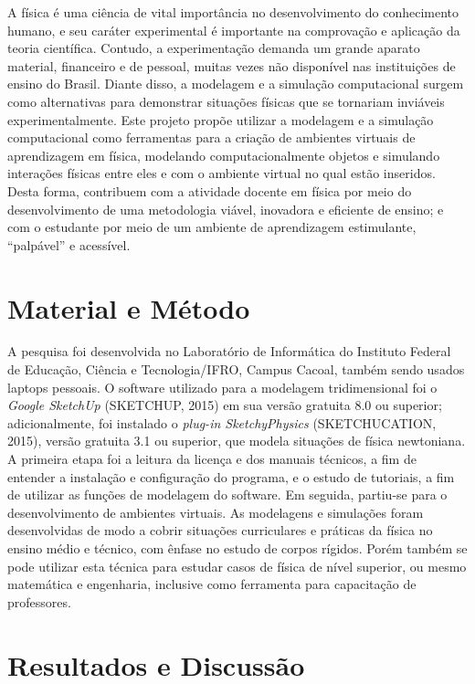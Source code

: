 \documentclass[article,12pt,onesidea,4paper,english,brazil]{abntex2}
\begin{document}
	A física é uma ciência de vital importância no desenvolvimento do conhecimento humano, e seu caráter experimental é importante na comprovação e aplicação da teoria científica. Contudo, a experimentação demanda um grande aparato material, financeiro e de pessoal, muitas vezes não disponível nas instituições de ensino do Brasil. Diante disso, a modelagem e a simulação computacional surgem como alternativas para demonstrar situações físicas que se tornariam inviáveis experimentalmente. Este projeto propõe utilizar a modelagem e a simulação computacional como ferramentas para a criação de ambientes virtuais de aprendizagem em física, modelando computacionalmente objetos e simulando interações físicas entre eles e com o ambiente virtual no qual estão inseridos. Desta forma, contribuem com a atividade docente em física por meio do desenvolvimento de uma metodologia viável, inovadora e eficiente de ensino; e com o estudante por meio de um ambiente de aprendizagem estimulante, “palpável” e acessível.
	
	\section*{Material e Método}
	
A pesquisa foi desenvolvida no Laboratório de Informática do Instituto Federal de Educação, Ciência e Tecnologia/IFRO, Campus Cacoal, também sendo usados laptops pessoais. O software utilizado para a modelagem tridimensional foi o\textit{ Google SketchUp} (SKETCHUP, 2015) em sua versão gratuita 8.0 ou superior; adicionalmente, foi instalado o\textit{ plug-in SketchyPhysics} (SKETCHUCATION, 2015), versão gratuita 3.1 ou superior, que modela situações de física newtoniana. A primeira etapa foi a leitura da licença e dos manuais técnicos, a fim de entender a instalação e configuração do programa, e o estudo de tutoriais, a fim de utilizar as funções de modelagem do software. Em seguida, partiu-se para o desenvolvimento de ambientes virtuais. As modelagens e simulações foram desenvolvidas de modo a cobrir situações curriculares e práticas da física no ensino médio e técnico, com ênfase no estudo de corpos rígidos. Porém também se pode utilizar esta técnica para estudar casos de física de nível superior, ou mesmo matemática e engenharia, inclusive como ferramenta para capacitação de professores.
	\section*{Resultados e Discussão}
	
\end{document}

